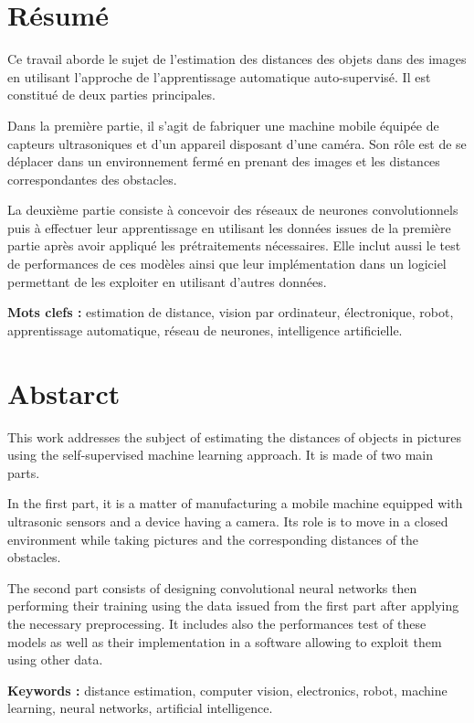 \begin{titlepage}

  \vspace*{\fill}

  \section*{\LARGE Résumé}

  Ce travail aborde le sujet de l'estimation des distances des objets dans des images
  en utilisant l'approche de l'apprentissage automatique auto-supervisé.
  Il est constitué de deux parties principales.

  Dans la première partie, il s'agit de fabriquer une machine mobile équipée de
  capteurs ultrasoniques et d'un appareil disposant d'une caméra. Son rôle
  est de se déplacer dans un environnement fermé en prenant des images et les
  distances correspondantes des obstacles.

  La deuxième partie consiste à concevoir des réseaux de neurones convolutionnels
  puis à effectuer leur apprentissage en utilisant les données issues de la première
  partie après avoir appliqué les prétraitements nécessaires. Elle inclut aussi
  le test de performances de ces modèles ainsi que leur implémentation dans un
  logiciel permettant de les exploiter en utilisant d'autres données.

  \textbf{Mots clefs :} estimation de distance, vision par ordinateur,
  électronique, robot, apprentissage automatique, réseau de neurones, intelligence artificielle.

  \vspace{0.5em}

  \section*{\LARGE Abstarct}

  This work addresses the subject of estimating the distances of objects in pictures
  using the self-supervised machine learning approach. It is made of two main parts.

  In the first part, it is a matter of manufacturing a mobile machine equipped with
  ultrasonic sensors and a device having a camera. Its role is to move in a closed
  environment while taking pictures and the corresponding distances of the obstacles.

  The second part consists of designing convolutional neural networks then performing
  their training using the data issued from the first part after applying the
  necessary preprocessing. It includes also the performances test of these models
  as well as their implementation in a software allowing to exploit them using
  other data.

  \textbf{Keywords :} distance estimation, computer vision,
  electronics, robot, machine learning, neural networks, artificial intelligence.

  \vspace*{\fill}

\end{titlepage}
